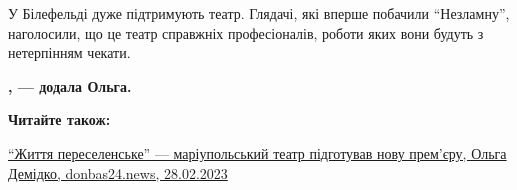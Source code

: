 У Білефельді дуже підтримують театр. Глядачі, які вперше побачили \enquote{Незламну},
наголосили, що це театр справжніх професіоналів, роботи яких вони будуть з
нетерпінням чекати.

\begin{leftbar}
	\begingroup
		\bfseries
{}, — додала Ольга. 
	\endgroup
\end{leftbar}

\textbf{Читайте також:} 

\href{https://donbas24.news/news/zittya-pereselenske-mariupolskii-teatr-pidgotuvav-novu-premjeru}{%
\enquote{Життя переселенське} — маріупольський театр підготував нову прем'єру, Ольга Демідко, %
donbas24.news, 28.02.2023}


